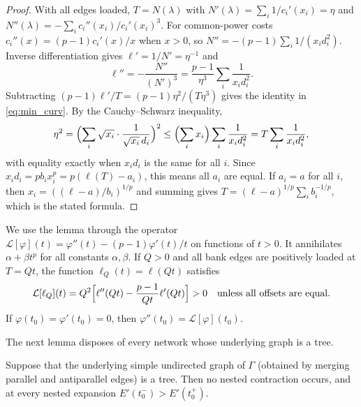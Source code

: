 \begin{proof}
With all edges loaded, $T=N(\lambda)$ with
$N'(\lambda)=\sum_i1/c_i'(x_i)=\eta$ and
$N''(\lambda)=-\sum_ic_i''(x_i)/c_i'(x_i)^3$. For common-power costs
$c_i''(x)=(p-1)c_i'(x)/x$ when $x>0$, so
$N''=-(p-1)\sum_i1/(x_id_i^2)$. Inverse differentiation gives
$\ell'=1/N'=\eta^{-1}$ and
\[
 \ell''=-\frac{N''}{(N')^3}=\frac{p-1}{\eta^3}\sum_i\frac1{x_id_i^2}.
\]
Subtracting $(p-1)\ell'/T=(p-1)\eta^2/(T\eta^3)$ gives the identity in
\eqref{eq:min_curv}. By the Cauchy--Schwarz inequality,
\[
 \eta^2=\Bigl(\sum_i\sqrt{x_i}\cdot\frac1{\sqrt{x_i}\,d_i}\Bigr)^2
 \le\Bigl(\sum_ix_i\Bigr)\sum_i\frac1{x_id_i^2}=T\sum_i\frac1{x_id_i^2},
\]
with equality exactly when $x_i d_i$ is the same for all $i$. Since
$x_id_i=pb_ix_i^p=p(\ell(T)-a_i)$, this means all $a_i$ are equal. If
$a_i=a$ for all $i$, then $x_i=((\ell-a)/b_i)^{1/p}$ and summing gives
$T=(\ell-a)^{1/p}\sum_ib_i^{-1/p}$, which is the stated formula.
\end{proof}

We use the lemma through the operator $\mathcal L[\varphi](t)=\varphi''(t)-
(p-1)\varphi'(t)/t$ on functions of $t>0$. It annihilates $\alpha+\beta t^p$
for all constants $\alpha,\beta$. If $Q>0$ and all bank edges are positively
loaded at $T=Qt$, the function $\ell_Q(t)=\ell(Qt)$ satisfies
\begin{equation}\label{eq:min_tcurv}
 \mathcal L[\ell_Q](t)=Q^2\Bigl[\ell''(Qt)-\frac{p-1}{Qt}\ell'(Qt)\Bigr]>0
 \quad\text{unless all offsets are equal.}
\end{equation}
If $\varphi(t_0)=\varphi'(t_0)=0$, then $\varphi''(t_0)=\mathcal L[\varphi](t_0)$.

The next lemma disposes of every network whose underlying graph is a tree.

\begin{lemma}\label{lem:tree}
Suppose that the underlying simple undirected graph of $\Gamma$ (obtained by
merging parallel and antiparallel edges) is a tree. Then no nested
contraction occurs, and at every nested expansion
$E'(t_0^-)>E'(t_0^+)$.
\end{lemma}

